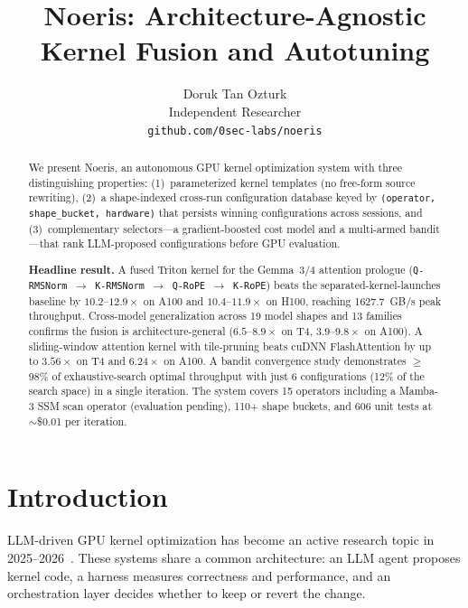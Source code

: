 \documentclass{article}
\title{Noeris: Architecture-Agnostic Kernel Fusion and Autotuning}
\author{
  Doruk Tan Ozturk \\
  Independent Researcher \\
  \texttt{github.com/0sec-labs/noeris}
}
\begin{document}
\maketitle

\begin{abstract}
We present Noeris, an autonomous GPU kernel optimization system with three
distinguishing properties: (1)~parameterized kernel templates (no free-form
source rewriting), (2)~a shape-indexed cross-run configuration database keyed
by \texttt{(operator, shape\_bucket, hardware)} that persists winning
configurations across sessions, and (3)~complementary selectors---a
gradient-boosted cost model and a multi-armed bandit---that rank LLM-proposed
configurations before GPU evaluation.

\textbf{Headline result.} A fused Triton kernel for the Gemma~3/4 attention
prologue (\texttt{Q-RMSNorm $\to$ K-RMSNorm $\to$ Q-RoPE $\to$ K-RoPE}) beats
the separated-kernel-launches baseline by $10.2\text{--}12.9\times$ on A100 and
$10.4\text{--}11.9\times$ on H100, reaching 1627.7~GB/s peak throughput.
Cross-model generalization across 19 model shapes and 13 families confirms the
fusion is architecture-general ($6.5\text{--}8.9\times$ on T4,
$3.9\text{--}9.8\times$ on A100). A sliding-window attention kernel with
tile-pruning beats cuDNN FlashAttention by up to $3.56\times$ on T4 and
$6.24\times$ on A100. A bandit convergence study demonstrates $\geq$98\% of
exhaustive-search optimal throughput with just 6 configurations (12\% of the
search space) in a single iteration. The system covers 15 operators including a
Mamba-3 SSM scan operator (evaluation pending), 110+ shape buckets, and 606 unit
tests at $\sim$\$0.01 per iteration.
\end{abstract}

\section{Introduction}
\label{sec:intro}


LLM-driven GPU kernel optimization has become an active research topic in
2025--2026~\cite{autokernel,kernelskill,cudal1,cudaagent,kernelfoundry}.
These systems share a common architecture: an LLM agent proposes kernel code,
a harness measures correctness and performance, and an orchestration layer
decides whether to keep or revert the change.
\end{document}
